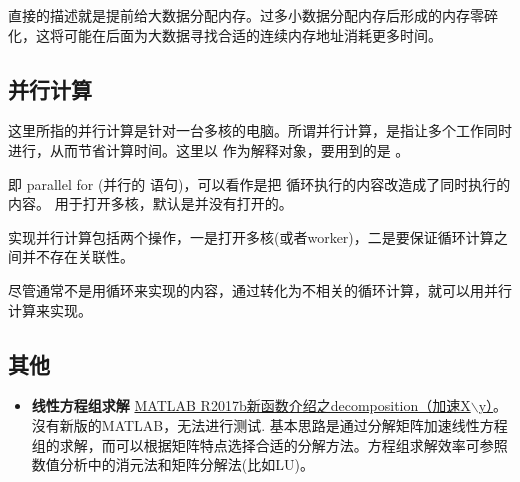 直接的描述就是提前给大数据分配内存。过多小数据分配内存后形成的内存零碎化，这将可能在后面为大数据寻找合适的连续内存地址消耗更多时间。





\subsection{并行计算}

这里所指的并行计算是针对一台多核的电脑。所谓并行计算，是指让多个工作同时进行，从而节省计算时间。这里以  作为解释对象，要用到的是 。\par

 即 parallel for (并行的  语句)，可以看作是把  循环执行的内容改造成了同时执行的内容。  用于打开多核，默认是并没有打开的。\par

实现并行计算包括两个操作，一是打开多核(或者worker)，二是要保证循环计算之间并不存在关联性。

\vspace{-0.8cm}


\vspace{-0.8cm}


尽管通常不是用循环来实现的内容，通过转化为不相关的循环计算，就可以用并行计算来实现。















\subsection{其他}

\begin{itemize}
    \item \textbf{线性方程组求解} \href{https://zhuanlan.zhihu.com/p/30958676}{MATLAB R2017b新函数介绍之decomposition（加速X$\backslash$y）}。沒有新版的MATLAB，无法进行测试. 基本思路是通过分解矩阵加速线性方程组的求解，而可以根据矩阵特点选择合适的分解方法。方程组求解效率可参照数值分析中的消元法和矩阵分解法(比如LU)。
\end{itemize}